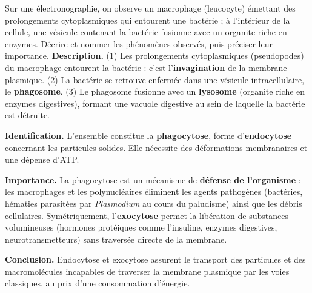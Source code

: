 \documentclass[11pt]{article}
\begin{document}
\begin{exoresolu}
Sur une électronographie, on observe un macrophage (leucocyte) émettant des prolongements cytoplasmiques qui entourent une bactérie ; à l'intérieur de la cellule, une vésicule contenant la bactérie fusionne avec un organite riche en enzymes. Décrire et nommer les phénomènes observés, puis préciser leur importance.
\tcblower
\textbf{Description.} (1) Les prolongements cytoplasmiques (pseudopodes) du macrophage entourent la bactérie : c'est l'\textbf{invagination} de la membrane plasmique. (2) La bactérie se retrouve enfermée dans une vésicule intracellulaire, le \textbf{phagosome}. (3) Le phagosome fusionne avec un \textbf{lysosome} (organite riche en enzymes digestives), formant une vacuole digestive au sein de laquelle la bactérie est détruite.

\textbf{Identification.} L'ensemble constitue la \textbf{phagocytose}, forme d'\textbf{endocytose} concernant les particules solides. Elle nécessite des déformations membranaires et une dépense d'ATP.

\textbf{Importance.} La phagocytose est un mécanisme de \textbf{défense de l'organisme} : les macrophages et les polynucléaires éliminent les agents pathogènes (bactéries, hématies parasitées par \emph{Plasmodium} au cours du paludisme) ainsi que les débris cellulaires. Symétriquement, l'\textbf{exocytose} permet la libération de substances volumineuses (hormones protéiques comme l'insuline, enzymes digestives, neurotransmetteurs) sans traversée directe de la membrane.

\textbf{Conclusion.} Endocytose et exocytose assurent le transport des particules et des macromolécules incapables de traverser la membrane plasmique par les voies classiques, au prix d'une consommation d'énergie.
\end{exoresolu}
\end{document}
